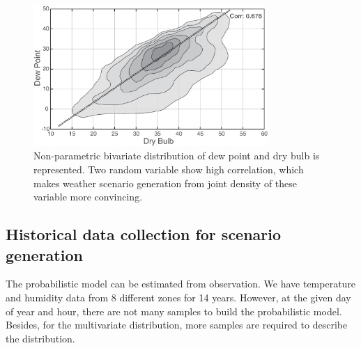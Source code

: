 \documentclass[journal]{IEEEtran} %
\begin{document}
  
  
  





\begin{figure}[t!]
\centering
  \includegraphics[width=3.5in]{Contour_AI}
\caption{Non-parametric bivariate distribution of dew point and dry bulb is represented. Two random variable show high correlation, which makes  weather scenario generation from joint density of these variable more convincing.}
\label{Dependency}       %
\end{figure}












\subsection{Historical data collection for scenario generation}
The probabilistic model can be estimated from observation. We have temperature and humidity data from 8 different zones for 14 years. However, at the given day of year and hour, there are not many samples to build the probabilistic model. Besides, for the multivariate distribution, more samples are required to describe the distribution. 
\end{document}
